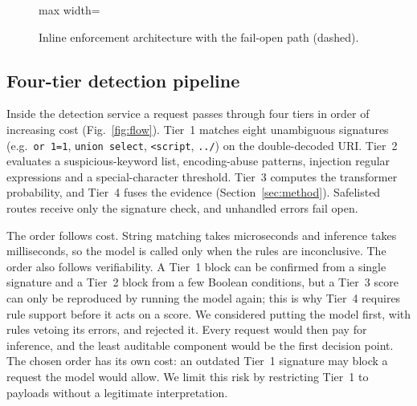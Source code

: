 \documentclass[preprint,11pt]{elsarticle}
\begin{document}
\begin{figure}[t]
\begin{adjustbox}{max width=\textwidth}
\end{adjustbox}
\caption{Inline enforcement architecture with the fail-open path (dashed).}
\label{fig:arch}
\end{figure}

\subsection{Four-tier detection pipeline}
Inside the detection service a request passes through four tiers in order
of increasing cost (Fig.~\ref{fig:flow}). Tier~1 matches eight unambiguous
signatures (e.g.\ \texttt{or 1=1}, \texttt{union select}, \texttt{<script},
\texttt{../}) on the double-decoded URI. Tier~2 evaluates a
suspicious-keyword list, encoding-abuse patterns, injection regular
expressions and a special-character threshold. Tier~3 computes the
transformer probability, and Tier~4 fuses the evidence
(Section~\ref{sec:method}). Safelisted routes receive only the signature
check, and unhandled errors fail open.

The order follows cost. String matching takes microseconds and inference
takes milliseconds, so the model is called only when the rules are
inconclusive. The order also follows verifiability. A Tier~1 block can be
confirmed from a single signature and a Tier~2 block from a few Boolean
conditions, but a Tier~3 score can only be reproduced by running the model
again; this is why Tier~4 requires rule support before it acts on a score.
We considered putting the model first, with rules vetoing its errors, and
rejected it. Every request would then pay for inference, and the least
auditable component would be the first decision point. The chosen order
has its own cost: an outdated Tier~1 signature may block a request the
model would allow. We limit this risk by restricting Tier~1 to payloads
without a legitimate interpretation.
\end{document}
